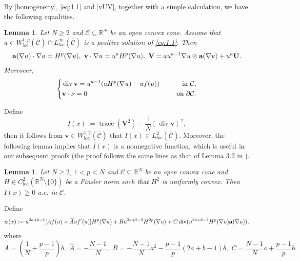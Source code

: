 \documentclass[12pt]{amsart}
\newtheorem{lem}[thm]{Lemma}
\theoremstyle{definition}
\theoremstyle{remark}
\theoremstyle{conclusion}
\theoremstyle{conjecture}
\numberwithin{equation}{section}
\begin{document}
By \eqref{homogeneity}, \eqref{eq:1.1} and \eqref{vUV}, together with a simple calculation, we have the following equalities.
\begin{lem}\label{ident}
Let $N\geq2$ and $\mathcal{C}\subseteq\mathbb{R}^{N}$ be an open convex cone. Assume that $u\in W^{1,p}_{loc}(\overline{\mathcal{C}})\cap L^{\infty}_{loc}(\overline{\mathcal{C}})$ is a positive solution of \eqref{eq:1.1}. Then
$${\bf{a}}(\nabla u)\cdot \nabla u=H^p(\nabla u),\,\,\mathbf{v}\cdot\nabla u=u^aH^p(\nabla u),\,\,\mathbf{V}=au^{a-1}\nabla u\otimes {\bf{a}}(\nabla u)+u^a\mathbf{U}.$$
Moreover,
 \begin{equation*}
      \left\{
          \begin{aligned}
          &\operatorname{div}\mathbf{v}=u^{a-1}(aH^p(\nabla u)-uf(u)) \quad\,\,\, &{\rm{in}} \,\, \mathcal{C}, \\
          &\mathbf{v}\cdot \nu =0 \quad\,\,\, &{\rm{on}} \,\, \partial\mathcal{C}.
          \end{aligned}
          \right.
    \end{equation*}
\end{lem}
Define
$$I(x):=\operatorname{trace}(\mathbf{V}^2)-\frac{1}{N}(\operatorname{div}\mathbf{v})^2,$$
then it follows from $\mathbf{v}\in W^{1,2}_{loc}(\overline{\mathcal{C}})$ that $I(x)\in L^2_{loc}(\overline{\mathcal{C}})$. Moreover, the following lemma implies that $I(x)$ is a nonnegative function, which is useful in our subsequent proofs (the proof follows the same lines as that of Lemma 3.2 in \cite{CHN}).
\begin{lem}\label{I(x)}
Let $N\geq2$, $1<p<N$ and $\mathcal{C}\subseteq\mathbb{R}^{N}$ be an open convex cone and $H\in C^{2}_{\text{loc}}(\mathbb{R}^{N}\setminus\{0\})$ be a Finsler norm such that $H^{2}$ is uniformly convex. Then $I(x)\geq0$ a.e. in $\mathcal{C}$.
\end{lem}

Define
$$\psi(x):=u^{2a+b-1}[Af(u)+\widehat{A}uf^{\prime}(u)]H^p(\nabla u)+Bu^{2a+b-2}H^{2p}(\nabla u)+C\operatorname{div}(u^{2a+b-1}H^p(\nabla u){\bf{a}}(\nabla u)),$$
where
$$A=\left(\frac{1}{N}+\frac{p-1}{p}\right)b,\,\,\widehat{A}=-\frac{N-1}{N},\,\,B=-\frac{N-1}{N}a^2-\frac{p-1}{p}(2a+b-1)b,\,\,C=\frac{N-1}{N}a+\frac{p-1}{p}b.$$

\medskip
\end{document}
